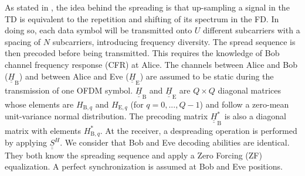 \documentclass[a4paper,11pt]{article}
\def\uu#1{\underline{\underline{#1}}}
\begin{document}
As stated in \cite{TR_FD_TD}, the idea behind the spreading is that up-sampling a signal in the TD is equivalent to the repetition and shifting of its spectrum in the FD. In doing so, each data symbol will be transmitted onto $U$ different subcarriers with a spacing of $N$ subcarriers, introducing frequency diversity. The spread sequence is then precoded before being transmitted. This requires the knowledge of Bob channel frequency response (CFR) at Alice.  The channels between Alice and Bob ($\uu{H}_{\text{B}}$) and between Alice and Eve ($\uu{H}_{\text{E}}$) are assumed to be static during the transmission of one OFDM symbol. $\uu{H}_{\text{B}}$ and $\uu{H}_{\text{E}}$ are $Q\times Q$ diagonal matrices whose elements are $H_{\text{B},q}$ and $H_{\text{E},q}$ (for $q = 0,...,Q-1$) and follow a zero-mean unit-variance normal distribution. The precoding matrix $\uu{H}_{\text{B}}^*$ is also a diagonal matrix with elements $H_{\text{B},q}^*$. At the receiver, a despreading operation is performed by applying $\uu{S}^H$. We consider that Bob and Eve decoding abilities are identical. They both know the spreading sequence and apply a Zero Forcing (ZF) equalization. A perfect synchronization is assumed at Bob and Eve positions.
\end{document}
